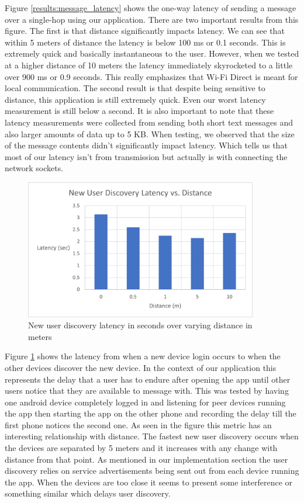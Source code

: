 \documentclass[10pt]{article}
\begin{document}
Figure \ref{results:message_latency} shows the one-way latency of sending a message over a single-hop using our application. There are two important results from this figure. The first is that distance significantly impacts latency. We can see that within 5 meters of distance the latency is below 100 ms or 0.1 seconds. This is extremely quick and basically instantaneous to the user. However, when we tested at a higher distance of 10 meters the latency immediately skyrocketed to a little over 900 ms or 0.9 seconds. This really emphasizes that Wi-Fi Direct is meant for local communication. The second result is that despite being sensitive to distance, this application is still extremely quick. Even our worst latency measurement is still below a second. It is also important to note that these latency measurements were collected from sending both short text messages and also larger amounts of data up to 5 KB. When testing, we observed that the size of the message contents didn't significantly impact latency. Which tells us that most of our latency isn't from transmission but actually is with connecting the network sockets.

\begin{figure}[h!]
    \centering
    \includegraphics[width=4in]{new_user_dicovery_graph.png}
    \caption{New user discovery latency in seconds over varying distance in meters}
    \label{results:new_user}
\end{figure}

Figure \ref{results:new_user} shows the latency from when a new device login occurs to when the other devices discover the new device. In the context of our application this represents the delay that a user has to endure after opening the app until other users notice that they are available to message with. This was tested by having one android device completely logged in and listening for peer devices running the app then starting the app on the other phone and recording the delay till the first phone notices the second one. As seen in the figure this metric has an interesting relationship with distance. The fastest new user discovery occurs when the devices are separated by 5 meters and it increases with any change with distance from that point. As mentioned in our implementation section the user discovery relies on service advertisements being sent out from each device running the app. When the devices are too close it seems to present some interference or something similar which delays user discovery.
\end{document}
